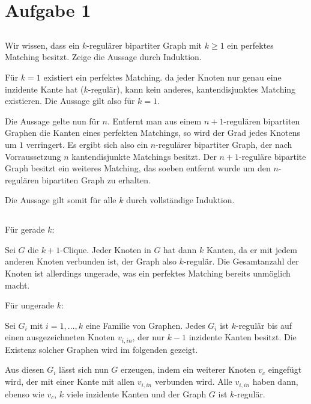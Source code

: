 \documentclass[a4paper]{article}
\begin{document}
\section{Aufgabe 1}
\subsection{}


\subsection{}
Wir wissen, dass ein $k$-regulärer bipartiter Graph mit $k \geq 1$ ein perfektes
Matching besitzt. Zeige die Aussage durch Induktion.

Für $k = 1$ existiert ein perfektes Matching. da jeder Knoten nur genau eine
inzidente Kante hat ($k$-regulär), kann kein anderes, kantendisjunktes
Matching existieren. Die Aussage gilt also für $k = 1$.

Die Aussage gelte nun für $n$.
Entfernt man aus einem $n+1$-regulären bipartiten Graphen die Kanten eines perfekten
Matchings, so wird der Grad jedes Knotens um $1$ verringert. Es ergibt sich
also ein $n$-regulärer bipartiter Graph, der nach Vorraussetzung $n$ kantendisjunkte
Matchings besitzt. Der $n+1$-reguläre bipartite Graph besitzt ein weiteres Matching,
das soeben entfernt wurde um den $n$-regulären bipartiten Graph zu erhalten.

Die Aussage gilt somit für alle $k$ durch vollständige Induktion.

\pagebreak
\subsection{}
Für gerade $k$:

Sei $G$ die $k+1$-Clique. Jeder Knoten in $G$ hat dann $k$ Kanten, da er mit
jedem anderen Knoten verbunden ist, der Graph also $k$-regulär. Die 
Gesamtanzahl der Knoten ist allerdings ungerade, was ein perfektes Matching
bereits unmöglich macht.

Für ungerade $k$:

Sei $G_i$ mit $i = 1, ..., k$ eine Familie von Graphen.
Jedes $G_i$ ist $k$-regulär bis auf einen ausgezeichneten Knoten $v_{i,
in}$, der nur $k-1$ inzidente Kanten besitzt. Die Existenz solcher Graphen
wird im folgenden gezeigt.

Aus diesen $G_i$ lässt sich nun $G$ erzeugen, indem ein weiterer Knoten
$v_c$ eingefügt wird, der mit einer Kante mit allen $v_{i, in}$ verbunden
wird. Alle $v_{i, in}$ haben dann, ebenso wie $v_c$, $k$ viele inzidente
Kanten und der Graph $G$ ist $k$-regulär.
\end{document}
